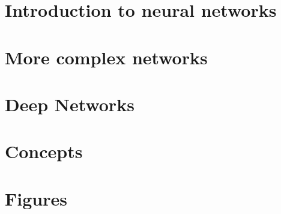 \documentclass[14pt]{report}
\begin{document}
\tableofcontents
\chapter{Introduction to neural networks}




\chapter{More complex networks}


\chapter{Deep Networks}
\chapter{Concepts}

\chapter{Figures}

\end{document}
